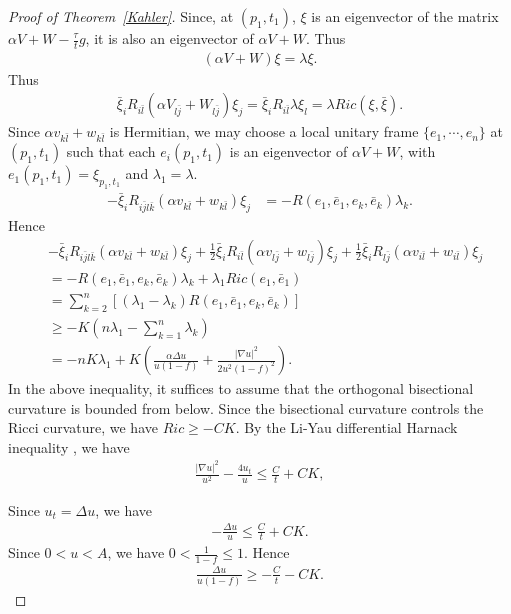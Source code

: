 \documentclass{amsart}
\theoremstyle{definition}
\theoremstyle{remark}
\numberwithin{equation}{section}
\begin{document}
\begin{proof}[Proof of Theorem~\ref{Kahler}]
Since, at $(p_{1},t_{1})$, $\xi$ is an eigenvector of the matrix $\alpha V+W-\frac{\tau}{t}g$, it is also an eigenvector of $\alpha V+W$. Thus
\begin{align}
(\alpha V+W)\xi=\lambda \xi.
\end{align}
Thus
\begin{align}
\bar{\xi}_i R_{i \bar{l}} \left(\alpha V_{l \bar{j}}+W_{l \bar{j}}\right) \xi_j=\bar{\xi}_i R_{i \bar{l}} \lambda \xi_l=\lambda Ric(\xi, \bar{\xi}).
\end{align}
Since $\alpha v_{k\bar{l}}+w_{k\bar{l}}$ is Hermitian, we may choose a local unitary frame $\{e_{1},\cdots, e_{n}\}$ at $(p_{1},t_{1})$ such that each $e_i(p_{1},t_{1})$ is an eigenvector of $\alpha V+W$, with $e_{1}(p_{1},t_{1})=\xi_{p_{1},t_{1}}$ and $\lambda_1 = \lambda$. 
\begin{align}
-\bar{\xi}_{i}R_{i\bar{j}l\bar{k}}(\alpha v_{k\bar{l}}+w_{k\bar{l}})\xi_{j}&=-R(e_{1},\bar{e}_{1},e_{k},\bar{e}_{k})\lambda_{k}.
\end{align}
Hence 
\begin{align}
&-\bar{\xi}_{i}R_{i\bar{j}l\bar{k}}(\alpha v_{k\bar{l}}+w_{k\bar{l}})\xi_{j}
  + \frac12 \bar{\xi}_{i}R_{i\bar{l}}(\alpha v_{l\bar{j}}
  + w_{l\bar{j}})\xi_{j}
  + \frac12\bar{\xi}_{i}R_{l\bar{j}}(\alpha v_{i\bar{l}}+w_{i\bar{l}})\xi_{j}\nonumber\\
&=-R(e_{1},\bar{e}_{1},e_{k},\bar{e}_{k})\lambda_{k}+\lambda_{1}Ric(e_{1},\bar{e}_{1})\nonumber\\
&=\sum_{k=2}^{n}[(\lambda_{1}-\lambda_{k})R(e_{1},\bar{e}_{1},e_{k},\bar{e}_{k})]\nonumber\\
&\geq -K(n\lambda_{1}-\sum_{k=1}^{n}\lambda_{k})\nonumber\\
&\label{main term in P+Q}=-nK\lambda_{1}+K\left(\frac{\alpha \Delta u}{u(1-f)}+\frac{|\nabla u|^{2}}{2u^{2}(1-f)^{2}}\right).
\end{align}
In the above inequality, it suffices to assume that the orthogonal bisectional curvature is bounded from below.
Since the bisectional curvature controls the Ricci curvature, we have $Ric \geq -CK$.
By the Li-Yau differential Harnack inequality \cite{S-Y}, we have 
\begin{align*}
\frac{|\nabla u|^{2}}{u^{2}}-\frac{4u_{t}}{u}\leq \frac{C}{t}+CK,
\end{align*}

Since $u_{t}=\Delta u$, we have 
\begin{align}\label{eq:2.20}
-\frac{\Delta u}{u}\leq \frac{C}{t}+CK.
\end{align}
Since $0<u<A$, we have $0<\frac{1}{1-f}\leq 1$.
Hence 
\begin{align*}
\frac{\Delta u}{u(1-f)}\geq -\frac{C}{t}-CK.
\end{align*}


\end{proof}
\end{document}
